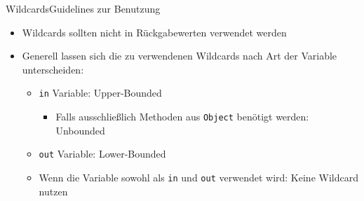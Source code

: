 \begin{frame}{Wildcards}{Guidelines zur Benutzung}
\begin{itemize}
    \item Wildcards sollten nicht in Rückgabewerten verwendet werden
    \item Generell lassen sich die zu verwendenen Wildcards nach Art der Variable unterscheiden:
    \begin{itemize}
        \item \texttt{in} Variable: Upper-Bounded
        \begin{itemize}
            \item Falls ausschließlich Methoden aus \texttt{Object} benötigt werden: Unbounded
        \end{itemize}
        \item \texttt{out} Variable: Lower-Bounded
        \item Wenn die Variable sowohl als \texttt{in} und \texttt{out} verwendet wird: Keine Wildcard nutzen
    \end{itemize}
\end{itemize}
\end{frame}